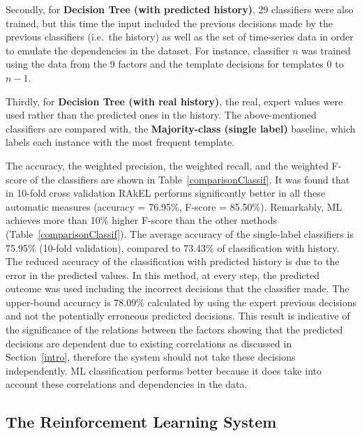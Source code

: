 \documentclass[11pt]{article}
\begin{document}
Secondly, for
\textbf{Decision Tree (with predicted history)}, 29 classifiers were also trained, 
but this time the input included the previous decisions made by the previous 
classifiers (i.e.\ the history) as well as the set of time-series
data  in order to emulate the dependencies in the dataset. For instance, classifier $n$ was trained using the data from the 9 factors and the template 
decisions for templates $0$ to $n-1$. 

Thirdly, for \textbf{Decision Tree (with real history)}, the real,
expert values were used rather than the predicted ones in the history.
The above-mentioned classifiers are compared with, the \textbf{Majority-class
  (single label)} baseline, which labels each instance with the most frequent template.


The accuracy, the weighted precision, the weighted recall, and the weighted 
F-score of the classifiers are shown in Table~\ref{comparisonClassif}. It was found that in 10-fold cross
 validation RAkEL performs significantly better in all these automatic
 measures (accuracy = 76.95\%, F-score = 85.50\%). 
Remarkably, ML achieves more than 10\% higher F-score than the other methods (Table~\ref{comparisonClassif}).
The average accuracy of the single-label classifiers is 75.95\% (10-fold validation), compared to 73.43\% of classification with history. 
The reduced accuracy of the classification with predicted history is due to the error in the predicted values. 
In this method, at every step, the predicted outcome was used including the incorrect decisions that the 
classifier made. The upper-bound accuracy is 78.09\% calculated by
using the expert previous decisions and not the potentially erroneous
predicted decisions. This result is indicative of the significance of the relations between 
the factors showing that the predicted decisions are dependent due to existing correlations as 
discussed in Section~\ref{intro}, therefore the system should not take these 
decisions independently. ML classification performs better 
because it does take into account these correlations and dependencies in the data.

\subsection{The Reinforcement Learning System} \label{rl}
\end{document}
